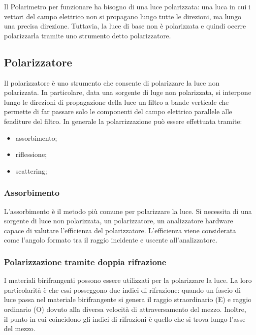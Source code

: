 \documentclass{article}
\begin{document}
Il Polarimetro per funzionare ha bisogno di una luce polarizzata: una luca in cui i vettori del campo elettrico non si propagano lungo tutte le direzioni, ma lungo una precisa direzione. Tuttavia, la luce di base non è polarizzata e quindi occrre polarizzarla tramite uno strumento detto polarizzatore.
\subsection{Polarizzatore}
Il polarizzatore è uno strumento che consente di polarizzare la luce non polarizzata. In particolare, data una sorgente di luge non polarizzata, si interpone lungo le direzioni di propagazione della luce un filtro a bande verticale che permette di far passare solo le componenti del campo elettrico parallele alle fenditure del filtro.
In generale la polarrizzazione può essere effettuata tramite:\begin{itemize}
    \item assorbimento;
    \item riflessione;
    \item scattering;
\end{itemize}
\subsubsection{Assorbimento}
L'assorbimento è il metodo più comune per polarizzare la luce. Si necessita di una sorgente di luce non polarizzata, un polarizzatore, un analizzatore hardware capace di valutare l'efficienza del polarizzatore. L'efficienza viene considerata come l'angolo formato tra il raggio incidente e uscente all'analizzatore.
\subsubsection{Polarizzazione tramite doppia rifrazione}
I materiali birifrangenti possono essere utilizzati per la polarizzare la luce. La loro particolarità è che essi posseggono due indici di rifrazione: quando un fascio di luce passa nel materiale birifrangente si genera il raggio straordinario (E) e raggio ordinario (O) dovuto alla diversa velocità di attraversamento del mezzo.\newline
Inoltre, il punto in cui coincidono gli indici di rifrazioni è quello che si trova lungo l'asse del mezzo.
\end{document}
